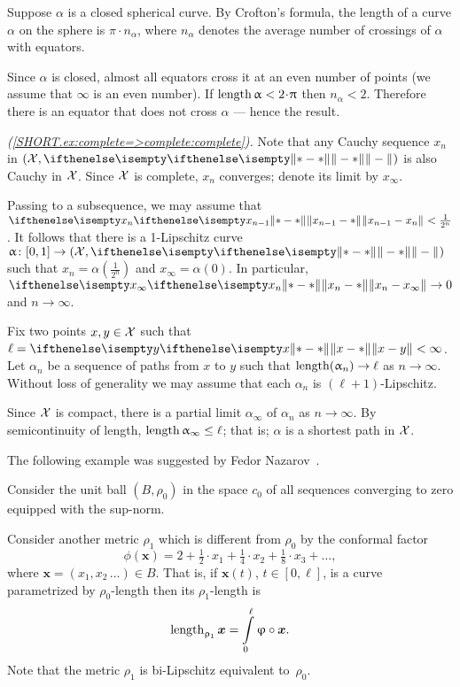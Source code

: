 Suppose $\alpha$ is a closed spherical curve. 
By Crofton's formula, the length of a curve $\alpha$ on the sphere is $\pi\cdot n_\alpha$, where $n_\alpha$ denotes the average number of crossings of $\alpha$ with equators.

Since $\alpha$ is closed, almost all equators cross it at an even number of points (we assume that $\infty$ is an even number).
If $\length \alpha<2\cdot\pi$ then $n_\alpha<2$.
Therefore there is an equator that does not cross $\alpha$ --- hence the result.


\parbf{\ref{ex:complete=>complete};}
\textit{(\ref{SHORT.ex:complete=>complete:complete}).}
Note that any Cauchy sequence $x_n$ in $(\spc{X},\yetdist{}{}{})$ is also Cauchy in $\mathcal{X}$.
Since $\mathcal{X}$ is complete, $x_n$ converges; denote its limit by $x_\infty$.

Passing to a subsequence, we may assume that $\yetdist{x_{n-1}}{x_n}{}<\tfrac1{2^n}$.
It follows that there is a 1-Lipschitz curve $\alpha\:[0,1]\to (\spc{X},\yetdist{}{}{})$ such that $x_n=\alpha(\tfrac1{2^n})$ and $x_\infty=\alpha(0)$.
In particular, $\yetdist{x_n}{x_\infty}{}\to0$ and $n\to\infty$.

Fix two points $x,y\in\spc{X}$ such that $\ell=\yetdist{x}{y}{}<\infty$.
Let $\alpha_n$ be a sequence of paths from $x$ to $y$ such that $\length(\alpha_n)\to\ell$ as $n\to \infty$.
Without loss of generality we may assume that each $\alpha_n$ is $(\ell+1)$-Lipschitz.

Since $\mathcal{X}$ is compact, there is a partial limit $\alpha_\infty$ of $\alpha_n$ as $n\to \infty$. By semicontinuity of length, $\length\alpha_\infty\le\ell$;
that is; $\alpha$ is a shortest path in $\mathcal{X}$.

The following example was suggested by Fedor Nazarov~\cite{nazarov}.

\medskip

Consider the unit ball $(B,\rho_0)$
in the space $c_0$ of all sequences converging to zero equipped with the sup-norm.

Consider another metric $\rho_1$ which is different from $\rho_0$ by the conformal factor
\[\phi(\bm{x})=2+\tfrac{1}2\cdot x_1+\tfrac{1}4\cdot x_2+\tfrac{1}8\cdot x_3+\dots,\]
where $\bm{x}=(x_1,x_2\,\dots)\in B$.
That is, if $\bm{x}(t)$, $t\in[0,\ell]$, is a curve parametrized by $\rho_0$-length 
then its $\rho_1$-length is 
\[\length_{\rho_1}\bm{x}=\int\limits_0^\ell\phi\circ\bm{x}.\]
Note that the metric $\rho_1$ is bi-Lipschitz equivalent  to~$\rho_0$.

